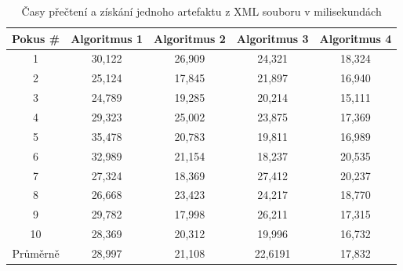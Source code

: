 \documentclass[czech,master]{diploma}
\begin{document}
\begin{table}[htp]
\centering
\begin{tabular}{@{}ccccc@{}}
\toprule
\textbf{Pokus \#} & \textbf{Algoritmus 1} & \textbf{Algoritmus 2} & \textbf{Algoritmus 3} & \textbf{Algoritmus 4} \\ \midrule
1                 & 30,122                & 26,909                & 24,321                & 18,324                \\
2                 & 25,124                & 17,845                & 21,897                & 16,940                \\
3                 & 24,789                & 19,285                & 20,214                & 15,111                \\
4                 & 29,323                & 25,002                & 23,875                & 17,369                \\
5                 & 35,478                & 20,783                & 19,811                & 16,989                \\
6                 & 32,989                & 21,154                & 18,237                & 20,535                \\
7                 & 27,324                & 18,369                & 27,412                & 20,237                \\
8                 & 26,668                & 23,423                & 24,217                & 18,770                \\
9                 & 29,782                & 17,998                & 26,211                & 17,315                \\
10                & 28,369                & 20,312                & 19,996                & 16,732                \\ \midrule
Průměrně          & 28,997               & 21,108                & 22,6191               & 17,832                \\ \bottomrule
\end{tabular}
\caption{Časy přečtení a získání jednoho artefaktu z XML souboru v milisekundách}
\label{tab:xml_read}
\end{table}
\end{document}
